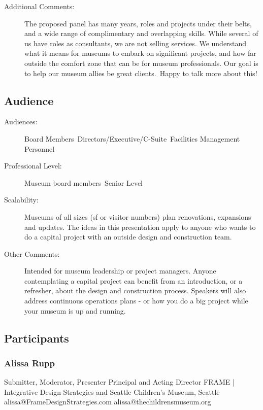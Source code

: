 \documentclass{report}
\begin{document}
\begin{description}
                    \item [Additional Comments: ]  The proposed panel has many years, roles and projects under their belts, and a wide range of complimentary and overlapping skills. While several of us have roles as consultants, we are not selling services. We understand what it means for museums to embark on significant projects, and how far outside the comfort zone that can be for museum professionals. Our goal is to help our museum allies be great clients. Happy to talk more about this! 
  

                \end{description}
              \subsection*{Audience}
                \begin{description}
                  \item [Audiences:]Board Members~Directors/Executive/C-Suite~Facilities Management Personnel~
                  \item[Professional Level:]Museum board members~Senior Level~
                \item[Scalability:]   Museums of all sizes (sf or visitor numbers) plan renovations, expansions and updates. The ideas in this presentation apply to anyone who wants to do a capital project with an outside design and construction team.
  

							
              \item[Other Comments:] Intended for museum leadership or project managers. 
Anyone contemplating a capital project can benefit from an introduction, or a refresher, about the design and construction process. Speakers will also address continuous operations plans - or how you do a big project while your museum is up and running.
              \end{description}
            \subsection*{Participants}
              \subsubsection*{ Alissa Rupp }
              Submitter, Moderator, Presenter\newline
              Principal      and        Acting Director\newline
              FRAME | Integrative Design Strategies    and    Seattle Children's Museum, Seattle
              \newline
              alissa@FrameDesignStrategies.com\newline
              alissa@thechildrensmuseum.org\newline
\end{document}
